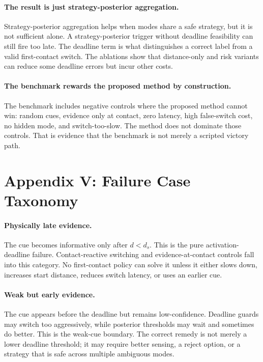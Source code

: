 \documentclass{article}
\begin{document}
\paragraph{The result is just strategy-posterior aggregation.}
Strategy-posterior aggregation helps when modes share a safe strategy, but it is not sufficient alone. A strategy-posterior trigger without deadline feasibility can still fire too late. The deadline term is what distinguishes a correct label from a valid first-contact switch. The ablations show that distance-only and risk variants can reduce some deadline errors but incur other costs.

\paragraph{The benchmark rewards the proposed method by construction.}
The benchmark includes negative controls where the proposed method cannot win: random cues, evidence only at contact, zero latency, high false-switch cost, no hidden mode, and switch-too-slow. The method does not dominate those controls. That is evidence that the benchmark is not merely a scripted victory path.

\section{Appendix V: Failure Case Taxonomy}

\paragraph{Physically late evidence.}
The cue becomes informative only after $d<d_s$. This is the pure activation-deadline failure. Contact-reactive switching and evidence-at-contact controls fall into this category. No first-contact policy can solve it unless it either slows down, increases start distance, reduces switch latency, or uses an earlier cue.

\paragraph{Weak but early evidence.}
The cue appears before the deadline but remains low-confidence. Deadline guards may switch too aggressively, while posterior thresholds may wait and sometimes do better. This is the weak-cue boundary. The correct remedy is not merely a lower deadline threshold; it may require better sensing, a reject option, or a strategy that is safe across multiple ambiguous modes.
\end{document}
